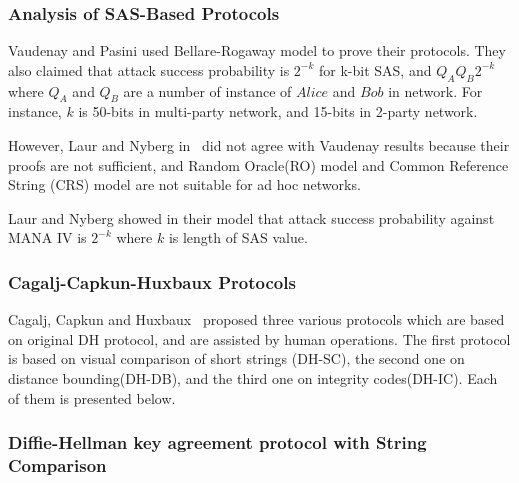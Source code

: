 \begin{enumerate}
\begin{enumerate}
\begin{enumerate}
\subsubsection*{Analysis of SAS-Based Protocols}

Vaudenay and Pasini used Bellare-Rogaway model to prove their protocols. They also claimed that attack success probability is $2^{-k}$ for k-bit SAS, and $Q_A Q_B 2^{-k}$ where $Q_A$ and $Q_B$ are a number of instance of $Alice$ and $Bob$ in network. For instance, $k$ is 50-bits in multi-party network, and 15-bits in 2-party network.

However, Laur and Nyberg in~\cite{Laur:2006kl} did not agree with Vaudenay results because their proofs are not sufficient, and Random Oracle(RO) model and Common Reference String (CRS) model are not suitable for ad hoc networks.

Laur and Nyberg showed in their model that attack success probability against MANA IV is $2^ {-k}$ where $k$ is length of SAS value.

\subsubsection{Cagalj-Capkun-Huxbaux Protocols}

Cagalj, Capkun and Huxbaux~\cite{1580514} proposed three various protocols which are based on original DH protocol, and are assisted by human operations. The first protocol is based on visual comparison of short strings (DH-SC), the second one on distance bounding(DH-DB), and the third one on integrity codes(DH-IC). Each of them is presented below. 
 
\subsubsection*{Diffie-Hellman key agreement protocol with String Comparison}


\end{enumerate}
\end{enumerate}
\end{enumerate}
